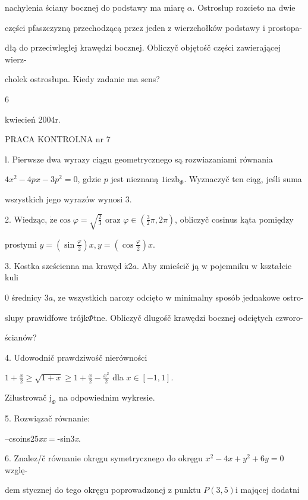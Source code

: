 \documentclass[a4paper,12pt]{article}
\begin{document}
nachylenia ściany bocznej do podstawy ma miarę $\alpha$. Ostrosłup rozcieto na dwie

części pfaszczyzną przechodzącą przez jeden $\mathrm{z}$ wierzchołków podstawy $\mathrm{i}$ prostopa-

dłą do przeciwległej krawędzi bocznej. Obliczyč objętośč części zawierającej wierz-

cholek ostrosłupa. Kiedy zadanie ma sens?

6





kwiecień 2004r.

PRACA KONTROLNA nr 7

l. Pierwsze dwa wyrazy ciągu geometrycznego są rozwiazaniami równania

$4x^{2}-4px-3p^{2}=0$, gdzie $p$ jest nieznaną $1\mathrm{i}\mathrm{c}\mathrm{z}\mathrm{b}_{\Phi}$. Wyznaczyč ten ciąg, jeśli suma

wszystkich jego wyrazów wynosi 3.

2. Wiedząc, $\dot{\mathrm{z}}\mathrm{e} \cos\varphi = \sqrt{\frac{2}{3}}$ oraz $\varphi \in (\displaystyle \frac{3}{2}\pi,2\pi)$, obliczyč cosinus kąta pomiędzy

prostymi $y=(\displaystyle \sin\frac{\varphi}{2})x, y=(\displaystyle \cos\frac{\varphi}{2})x.$

3. Kostka sześcienna ma krawęd $\acute{\mathrm{z}} 2a$. Aby zmieścič ją $\mathrm{w}$ pojemniku $\mathrm{w}$ kształcie kuli

$0$ średnicy $3a$, ze wszystkich narozy odcięto $\mathrm{w}$ minimalny sposób jednakowe ostro-

slupy prawidfowe trójk$\Phi$tne. Obliczyč dlugośč krawędzi bocznej odciętych czworo-

ścianów?

4. Udowodnič prawdziwośč nierówności

$1+\displaystyle \frac{x}{2}\geq\sqrt{1+x}\geq 1+\frac{x}{2}-\frac{x^{2}}{2}$ dla $x\in[-1,1].$

Zilustrowač $\mathrm{j}_{\Phi}$ na odpowiednim wykresie.

5. Rozwiązač równanie:

--csoins25{\it xx}$=$-sin3{\it x}.

6. Znalez/č równanie okręgu symetrycznego do okręgu $x^{2}-4x+y^{2}+6y=0$ wzglę-

dem stycznej do tego okręgu poprowadzonej $\mathrm{z}$ punktu $P(3,5) \mathrm{i}$ majqcej dodatni
\end{document}
